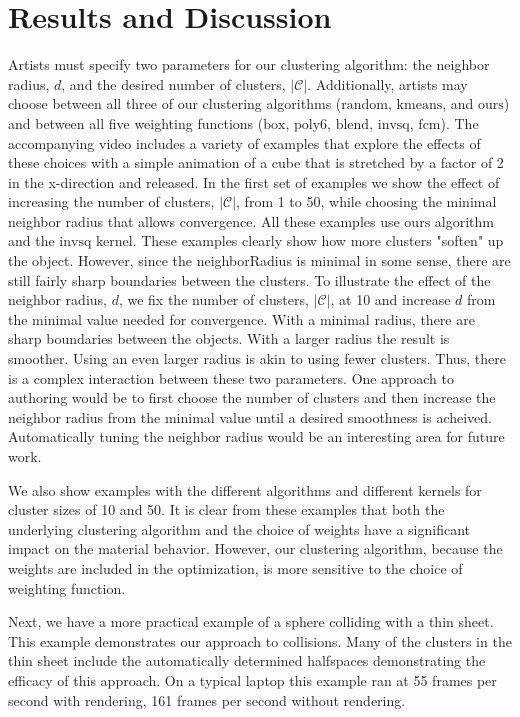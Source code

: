 \documentclass[review]{acmsiggraph}
\begin{document}
\section{Results and Discussion}
\label{sec:results}

Artists must specify two parameters for our clustering algorithm: the neighbor radius, $d$, and the desired number of clusters, 
$|\mathcal{C}|$.  Additionally, artists may choose between all three of our clustering algorithms ($\mathrm{random}$, $\mathrm{kmeans}$,
and $\mathrm{ours}$) and between all five weighting functions ($\mathrm{box}$, $\mathrm{poly6}$, $\mathrm{blend}$, $\mathrm{invsq}$, 
$\mathrm{fcm}$). The accompanying video includes a variety of examples that explore the effects of these choices with a simple animation
of a cube that is stretched by a factor of 2 in the x-direction and released.
In the first set of examples we show the effect of increasing the number of clusters, $|\mathcal{C}|$, from 1 to 50, while choosing the
minimal neighbor radius that allows convergence.  All these examples use $\mathrm{ours}$ algorithm and the $\mathrm{invsq}$ kernel.
These examples clearly show how more clusters "soften" up the object.  
However, since the neighborRadius is minimal in some sense, there are still fairly sharp boundaries between the clusters.
To illustrate the effect of the neighbor radius, $d$, we fix the number of clusters, $|\mathcal{C}|$, at 10 and increase $d$ from
the minimal value needed for convergence.  With a minimal radius, there are sharp boundaries between the objects.  With a larger
radius the result is smoother.  Using an even larger radius is akin to using fewer clusters.  Thus, there is a complex interaction
between these two parameters.  One approach to authoring would be to first choose the number of clusters and then increase the neighbor
radius from the minimal value until a desired smoothness is acheived.  Automatically tuning the neighbor radius would be an interesting
area for future work.

We also show examples with the different algorithms and different kernels for cluster sizes of 10 and 50.  
It is clear from these examples that both the underlying clustering algorithm and the choice of weights 
have a significant impact on the material behavior.  However, our clustering algorithm, because the weights
are included in the optimization, is more sensitive to the choice of weighting function.

Next, we have a more practical example of a sphere colliding with a thin sheet.  This example demonstrates our approach
to collisions.  Many of the clusters in the thin sheet include the automatically determined halfspaces demonstrating the efficacy
of this approach.  On a typical laptop this example ran at 55 frames per second with rendering, 161 frames per second without rendering.
\end{document}
